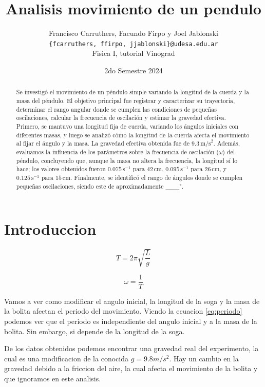 \documentclass[12pt,a4]{article}
\title{Analisis movimiento de un pendulo}
\author{Francisco Carruthers, Facundo Firpo y Joel Jablonski\\ [2mm]
\small \texttt{\{fcarruthers, ffirpo, jjablonski\}@udesa.edu.ar}\\
\small Fisica I, tutorial Vinograd}
\date{2do Semestre 2024}
\begin{document}
\maketitle

\begin{abstract}
    Se investigó el movimiento de un péndulo simple variando la longitud de la cuerda y la masa del péndulo. El objetivo principal fue registrar y caracterizar su trayectoria, determinar el rango angular donde se cumplen las condiciones de pequeñas oscilaciones, calcular la frecuencia de oscilación y estimar la gravedad efectiva. Primero, se mantuvo una longitud fija de cuerda, variando los ángulos iniciales con diferentes masas, y luego se analizó cómo la longitud de la cuerda afecta el movimiento al fijar el ángulo y la masa. La gravedad efectiva obtenida fue de $9.3 \, \text{m/s}^2$. Además, evaluamos la influencia de los parámetros sobre la frecuencia de oscilación ($\omega$) del péndulo, concluyendo que, aunque la masa no altera la frecuencia, la longitud sí lo hace; los valores obtenidos fueron $0.075 \, \text{s}^{-1}$ para $42 \, \text{cm}$, $0.095 \, \text{s}^{-1}$ para $26 \, \text{cm}$, y $0.125 \, \text{s}^{-1}$ para $15 \, \text{cm}$. Finalmente, se identificó el rango de ángulos donde se cumplen pequeñas oscilaciones, siendo este de aproximadamente \_\_\_°.

\end{abstract}

\section{Introduccion}

\begin{equation}
    T = 2 \pi \sqrt{\frac{L}{g}}
    \label{eq:periodo}
\end{equation}

\begin{equation}
    \omega = \frac{1}{T}
    \label{eq:omega}
\end{equation}

Vamos a ver como modificar el angulo inicial, la longitud de la soga y la masa de la bolita afectan el periodo del movimiento. Viendo la ecuacion \ref{eq:periodo} podemos ver que el periodo es independiente del angulo inicial y a la masa de la bolita. Sin embargo, si depende de la longitud de la soga. 

De los datos obtenidos podemos encontrar una gravedad real del experimento, la cual es una modificacion de la conocida $g = 9.8 m/s^2$. Hay un cambio en la gravedad debido a la friccion del aire, la cual afecta el movimiento de la bolita y que ignoramos en este analisis.
\end{document}
